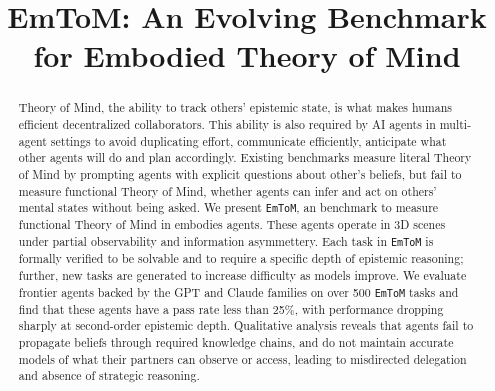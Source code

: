 \documentclass{article} %
\title{EmToM: An Evolving Benchmark for Embodied Theory of Mind}
\author{}
\newcommand{\shortname}{\texttt{EmToM}}
\begin{document}
\ifcolmsubmission
\linenumbers
\fi

\maketitle

\begin{abstract}
Theory of Mind, the ability to track others' epistemic state, is what makes humans efficient decentralized collaborators. This ability is also required by AI agents in multi-agent settings to avoid duplicating effort, communicate efficiently, anticipate what other agents will do and plan accordingly. 
Existing benchmarks measure literal Theory of Mind by prompting agents with explicit questions about other's beliefs, but fail to measure functional Theory of Mind, whether agents can infer and act on others' mental states without being asked.  
We present \shortname{}, an benchmark to measure functional Theory of Mind in embodies agents. These agents operate in 3D scenes under partial observability and information asymmettery.  Each task in \shortname{} is formally verified to be solvable and to require a specific depth of epistemic reasoning; further, new tasks are generated to increase difficulty as models  
improve. We evaluate frontier agents backed by the GPT and Claude families on over 500 \shortname{} tasks and find that these agents have a pass rate less than 25\%, with performance dropping sharply at second-order epistemic depth. Qualitative analysis reveals that agents fail to propagate beliefs through required knowledge chains, and do not maintain accurate models of what their partners can observe or access, leading to misdirected delegation and absence of strategic reasoning.                                                       
   


\end{abstract}
\end{document}
